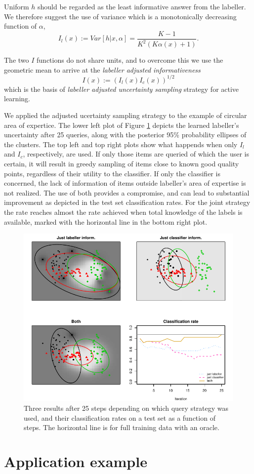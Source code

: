 \documentclass[10pt, onecolumn]{article}
\begin{document}
Uniform $h$ should be regarded as the least informative answer from the labeller. We therefore suggest the use of variance which is a monotonically decreasing function of $\alpha$, 
$$I_l(x):= Var [h|x, \alpha] = \frac{K-1}{K^2(K\alpha(x)+1)}.$$ 

The two $I$ functions do not share units, and to overcome this we use the geometric mean to arrive at the \emph{labeller adjusted informativeness}
 $$I(x):=(I_l(x) I_c(x))^{1/2}$$
which is the basis of \emph{labeller adjusted uncertainty sampling} strategy for active learning. 

We applied the adjusted ucertainty sampling strategy to the example of circular area of expertice. The lower left plot of Figure \ref{fig:four_square} depicts the learned labeller's uncertainty after 25 queries, along with the posterior 95\% probability ellipses of the clusters. The top left and top right plots show what happends when only $I_l$ and $I_c$, respectively, are used. If only those items are queried of which the user is certain, it will result in greedy sampling of items close to known good quality points, regardless of their utility to the classifier. If only the classifier is concerned, the lack of information of items outside labeller's area of expertise is not realized. The use of both provides a compromise, and can lead to substantial improvement as depicted in the test set classification rates. For the joint strategy the rate reaches almost the rate achieved when total knowledge of the labels is available, marked with the horizontal line in the bottom right plot.

\begin{figure}[hbtp]
\centering
\includegraphics[width=6in]{figures/3_fields_and_tsplot.pdf}
\caption{Three results after 25 steps depending on which query strategy was used, and their classification rates on a test set as a function of steps. The horizontal line is for full training data with an oracle.}
\label{fig:four_square}
\end{figure}

\section{Application example}
\end{document}
